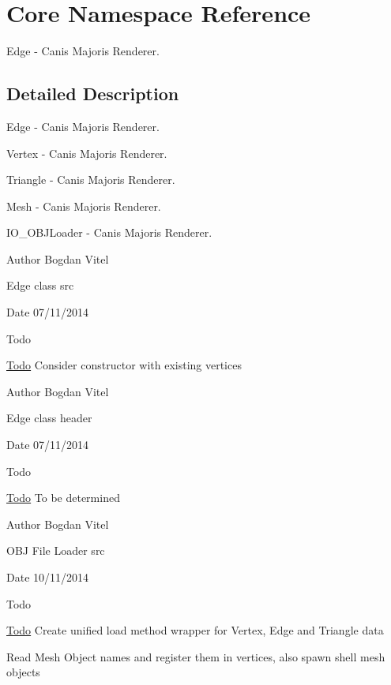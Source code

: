 \hypertarget{namespace_core}{\section{Core Namespace Reference}
\label{namespace_core}
}


Edge -\/ Canis Majoris Renderer.  




\subsection{Detailed Description}
Edge -\/ Canis Majoris Renderer. 

Vertex -\/ Canis Majoris Renderer.

Triangle -\/ Canis Majoris Renderer.

Mesh -\/ Canis Majoris Renderer.

I\+O\+\_\+\+O\+B\+J\+Loader -\/ Canis Majoris Renderer.

\begin{DoxyAuthor}{Author}
Bogdan Vitel
\end{DoxyAuthor}
Edge class src \begin{DoxyDate}{Date}
07/11/2014 
\end{DoxyDate}
\begin{DoxyRefDesc}{Todo}
\item[\hyperlink{todo__todo000002}{Todo}]Consider constructor with existing vertices \end{DoxyRefDesc}


\begin{DoxyAuthor}{Author}
Bogdan Vitel
\end{DoxyAuthor}
Edge class header \begin{DoxyDate}{Date}
07/11/2014 
\end{DoxyDate}
\begin{DoxyRefDesc}{Todo}
\item[\hyperlink{todo__todo000003}{Todo}]To be determined \end{DoxyRefDesc}


\begin{DoxyAuthor}{Author}
Bogdan Vitel
\end{DoxyAuthor}
O\+B\+J File Loader src \begin{DoxyDate}{Date}
10/11/2014 
\end{DoxyDate}
\begin{DoxyRefDesc}{Todo}
\item[\hyperlink{todo__todo000004}{Todo}]Create unified load method wrapper for Vertex, Edge and Triangle data 

Read Mesh Object names and register them in vertices, also spawn shell mesh objects \end{DoxyRefDesc}


